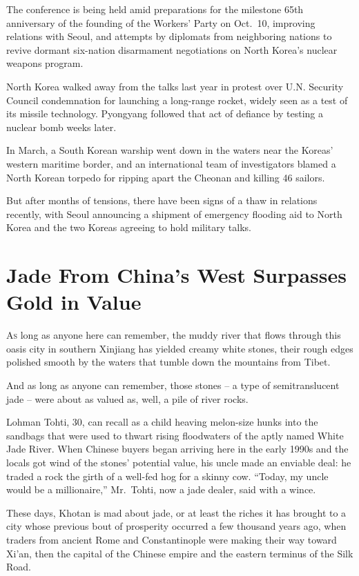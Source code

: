 ﻿\documentclass[12pt]{article}
\begin{document}
The conference is being held amid preparations for the milestone 65th anniversary of the founding of
the Workers' Party on Oct.~10, improving relations with Seoul, and attempts by diplomats from
neighboring nations to revive dormant six-nation disarmament negotiations on North Korea's nuclear
weapons program.

North Korea walked away from the talks last year in protest over U.N. Security Council condemnation
for launching a long-range rocket, widely seen as a test of its missile technology. Pyongyang
followed that act of defiance by testing a nuclear bomb weeks later.

In March, a South Korean warship went down in the waters near the Koreas' western maritime border,
and an international team of investigators blamed a North Korean torpedo for ripping apart the
Cheonan and killing 46 sailors.

But after months of tensions, there have been signs of a thaw in relations recently, with Seoul
announcing a shipment of emergency flooding aid to North Korea and the two Koreas agreeing to hold
military talks.

\pagebreak
\section{Jade From China's West Surpasses Gold in Value}

\lettrine{A}{s} long as anyone here can remember, the muddy river that
flows through this oasis city in southern Xinjiang has yielded creamy white stones, their rough
edges polished smooth by the waters that tumble down the mountains from Tibet.

And as long as anyone can remember, those stones -- a type of semitranslucent jade -- were about as
valued as, well, a pile of river rocks.

Lohman Tohti, 30, can recall as a child heaving melon-size hunks into the sandbags that were used to
thwart rising floodwaters of the aptly named White Jade River. When Chinese buyers began arriving
here in the early 1990s and the locals got wind of the stones' potential value, his uncle made an
enviable deal: he traded a rock the girth of a well-fed hog for a skinny cow. ``Today, my uncle
would be a millionaire,'' Mr.~Tohti, now a jade dealer, said with a wince.

These days, Khotan is mad about jade, or at least the riches it has brought to a city whose previous
bout of prosperity occurred a few thousand years ago, when traders from ancient Rome and
Constantinople were making their way toward Xi'an, then the capital of the Chinese empire and the
eastern terminus of the Silk Road.
\end{document}

